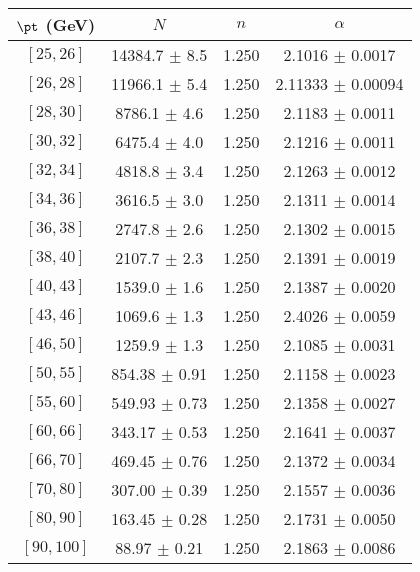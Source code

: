 \begin{tabular}{c||c|c|c}
$\pt$ (GeV) & $N$ & $n$ & $\alpha$ \\
\hline
$[25, 26]$ & 14384.7 $\pm$ 8.5 & 1.250 & 2.1016 $\pm$ 0.0017\\
$[26, 28]$ & 11966.1 $\pm$ 5.4 & 1.250 & 2.11333 $\pm$ 0.00094\\
$[28, 30]$ & 8786.1 $\pm$ 4.6 & 1.250 & 2.1183 $\pm$ 0.0011\\
$[30, 32]$ & 6475.4 $\pm$ 4.0 & 1.250 & 2.1216 $\pm$ 0.0011\\
$[32, 34]$ & 4818.8 $\pm$ 3.4 & 1.250 & 2.1263 $\pm$ 0.0012\\
$[34, 36]$ & 3616.5 $\pm$ 3.0 & 1.250 & 2.1311 $\pm$ 0.0014\\
$[36, 38]$ & 2747.8 $\pm$ 2.6 & 1.250 & 2.1302 $\pm$ 0.0015\\
$[38, 40]$ & 2107.7 $\pm$ 2.3 & 1.250 & 2.1391 $\pm$ 0.0019\\
$[40, 43]$ & 1539.0 $\pm$ 1.6 & 1.250 & 2.1387 $\pm$ 0.0020\\
$[43, 46]$ & 1069.6 $\pm$ 1.3 & 1.250 & 2.4026 $\pm$ 0.0059\\
$[46, 50]$ & 1259.9 $\pm$ 1.3 & 1.250 & 2.1085 $\pm$ 0.0031\\
$[50, 55]$ & 854.38 $\pm$ 0.91 & 1.250 & 2.1158 $\pm$ 0.0023\\
$[55, 60]$ & 549.93 $\pm$ 0.73 & 1.250 & 2.1358 $\pm$ 0.0027\\
$[60, 66]$ & 343.17 $\pm$ 0.53 & 1.250 & 2.1641 $\pm$ 0.0037\\
$[66, 70]$ & 469.45 $\pm$ 0.76 & 1.250 & 2.1372 $\pm$ 0.0034\\
$[70, 80]$ & 307.00 $\pm$ 0.39 & 1.250 & 2.1557 $\pm$ 0.0036\\
$[80, 90]$ & 163.45 $\pm$ 0.28 & 1.250 & 2.1731 $\pm$ 0.0050\\
$[90, 100]$ & 88.97 $\pm$ 0.21 & 1.250 & 2.1863 $\pm$ 0.0086\\
\end{tabular}
